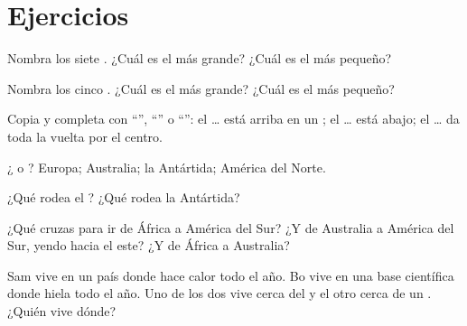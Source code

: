 \section{Ejercicios}

\begin{exercise}[$\star$]\label{exo:g3:continents-and-oceans:1}
Nombra los siete . ¿Cuál es el más grande? ¿Cuál es el más
pequeño?
\end{exercise}

\begin{exercise}[$\star$]\label{exo:g3:continents-and-oceans:2}
Nombra los cinco . ¿Cuál es el más grande? ¿Cuál es el más pequeño?
\end{exercise}

\begin{exercise}[$\star$]\label{exo:g3:continents-and-oceans:3}
Copia y completa con ``'', ``'' o ``'': el \dots{}
está arriba en un ; el \dots{} está abajo; el \dots{} da toda
la vuelta por el centro.
\end{exercise}

\begin{exercise}[$\star$]\label{exo:g3:continents-and-oceans:4}
¿ o ? Europa; Australia; la Antártida;
América del Norte.
\end{exercise}

\begin{exercise}[$\star$]\label{exo:g3:continents-and-oceans:5}
¿Qué  rodea el ? ¿Qué  rodea la Antártida?
\end{exercise}

\begin{exercise}[$\star\star$]\label{exo:g3:continents-and-oceans:6}
¿Qué  cruzas para ir de África a América del Sur? ¿Y de Australia a
América del Sur, yendo hacia el este? ¿Y de África a Australia?
\end{exercise}

\begin{exercise}[$\star\star$]\label{exo:g3:continents-and-oceans:7}
Sam vive en un país donde hace calor todo el año. Bo vive en una base
científica donde hiela todo el año. Uno de los dos vive cerca del  y
el otro cerca de un . ¿Quién vive dónde?
\end{exercise}

